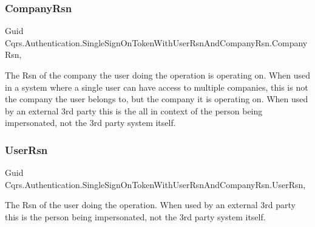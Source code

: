 \subsubsection{\texorpdfstring{Company\+Rsn}{CompanyRsn}}
{\footnotesize\ttfamily Guid Cqrs.\+Authentication.\+Single\+Sign\+On\+Token\+With\+User\+Rsn\+And\+Company\+Rsn.\+Company\+Rsn\hspace{0.3cm}{\ttfamily [get]}, {\ttfamily [set]}}



The Rsn of the company the user doing the operation is operating on. When used in a system where a single user can have access to multiple companies, this is not the company the user belongs to, but the company it is operating on. When used by an external 3rd party this is the all in context of the person being impersonated, not the 3rd party system itself. 

\mbox{\label{classCqrs_1_1Authentication_1_1SingleSignOnTokenWithUserRsnAndCompanyRsn_a4963f5699921952ac8b6439d5308090d_a4963f5699921952ac8b6439d5308090d}} 
\subsubsection{\texorpdfstring{User\+Rsn}{UserRsn}}
{\footnotesize\ttfamily Guid Cqrs.\+Authentication.\+Single\+Sign\+On\+Token\+With\+User\+Rsn\+And\+Company\+Rsn.\+User\+Rsn\hspace{0.3cm}{\ttfamily [get]}, {\ttfamily [set]}}



The Rsn of the user doing the operation. When used by an external 3rd party this is the person being impersonated, not the 3rd party system itself. 

